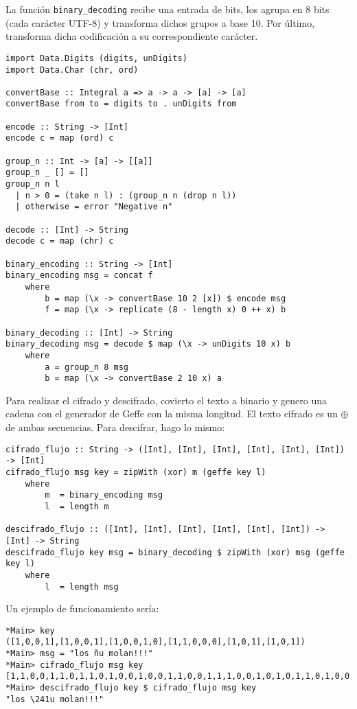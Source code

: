 \documentclass[10pt,spanish]{article}
\begin{document}
La función \texttt{binary\_decoding} recibe una entrada de bits, los agrupa en 8 bits (cada carácter UTF-8) y transforma dichos grupos a base 10. Por último, transforma dicha codificación a su correspondiente carácter.

\begin{verbatim}
import Data.Digits (digits, unDigits)
import Data.Char (chr, ord)

convertBase :: Integral a => a -> a -> [a] -> [a]
convertBase from to = digits to . unDigits from

encode :: String -> [Int]
encode c = map (ord) c

group_n :: Int -> [a] -> [[a]]
group_n _ [] = []
group_n n l
  | n > 0 = (take n l) : (group_n n (drop n l))
  | otherwise = error "Negative n"

decode :: [Int] -> String
decode c = map (chr) c

binary_encoding :: String -> [Int]
binary_encoding msg = concat f
    where
        b = map (\x -> convertBase 10 2 [x]) $ encode msg
        f = map (\x -> replicate (8 - length x) 0 ++ x) b 

binary_decoding :: [Int] -> String
binary_decoding msg = decode $ map (\x -> unDigits 10 x) b
    where
        a = group_n 8 msg
        b = map (\x -> convertBase 2 10 x) a
\end{verbatim}

Para realizar el cifrado y descifrado, covierto el texto a binario y genero una cadena con el generador de Geffe con la misma longitud. El texto cifrado es un $\oplus$ de ambas secuencias. Para descifrar, hago lo mismo:

\begin{verbatim}
cifrado_flujo :: String -> ([Int], [Int], [Int], [Int], [Int], [Int]) -> [Int]
cifrado_flujo msg key = zipWith (xor) m (geffe key l)
    where
        m  = binary_encoding msg
        l  = length m

descifrado_flujo :: ([Int], [Int], [Int], [Int], [Int], [Int]) -> [Int] -> String
descifrado_flujo key msg = binary_decoding $ zipWith (xor) msg (geffe key l)
    where
        l  = length msg
\end{verbatim}

Un ejemplo de funcionamiento sería:

\begin{verbatim}
*Main> key
([1,0,0,1],[1,0,0,1],[1,0,0,1,0],[1,1,0,0,0],[1,0,1],[1,0,1])
*Main> msg = "los ñu molan!!!"
*Main> cifrado_flujo msg key
[1,1,0,0,1,1,0,1,1,0,1,0,0,1,0,0,1,1,0,0,1,1,1,0,0,1,0,1,0,1,1,0,1,0,0,0,0,1,1,0,1,0,0,1,1,1,0,0,1,0,1,1,0,0,1,1,0,1,1,1,0,0,0,0,0,0,1,1,0,0,0,1,1,1,0,1,0,1,0,1,0,1,0,1,1,1,1,0,0,0,0,0,1,0,1,0,1,1,0,1,1,0,1,0,1,1,1,1,1,0,1,1,1,0,0,0,0,1,0,0]
*Main> descifrado_flujo key $ cifrado_flujo msg key
"los \241u molan!!!"
\end{verbatim}
\end{document}
